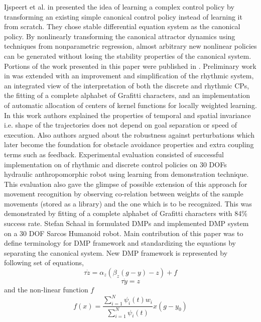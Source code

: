 Ijspeert et al. in \cite{ijspeert2003learning} presented the idea of learning a complex control policy by transforming
an existing simple canonical control policy instead of learning it from scratch. They chose stable differential equation system as the canonical policy. By nonlinearly transforming the canonical attractor dynamics using techniques from nonparametric regression, almost arbitrary new nonlinear policies can be generated without losing the stability properties of the canonical system. Portions of the work presented in this paper were published in \cite{ijspeert2002movement}. Preliminary work in \cite{ijspeert2002movement} was extended with an improvement and simplification of the rhythmic system, an integrated view of the interpretation of both the discrete and rhythmic CPs, the fitting of a complete alphabet of Grafitti characters, and an implementation of automatic allocation of centers of kernel functions for locally weighted learning. In this work authors explained the properties of temporal and spatial invariance i.e. shape of the trajectories does not depend on goal separation or speed of execution. Also authors argued about the robustness against perturbations which later become the foundation for obstacle avoidance properties and extra coupling terms such as feedback.
Experimental evaluation consisted of successful implementation on of rhythmic and discrete control policies on 30 DOFs hydraulic anthropomorphic robot using learning from demonstration technique. This evaluation also gave the glimpse of possible extension of this approach for movement recognition by observing co-relation between weights of the sample movements (stored as a library) and the one which is to be recognized. This was demonstrated by fitting of a complete alphabet of Grafitti characters with 84\% success rate. 
\newline
Stefan Schaal in \cite{schaal2006dynamic} formulated DMPs and implemented DMP system on a 30 DOF Sarcos Humanoid robot. Main contribution of this paper was to define terminology for DMP framework and standardizing the equations by separating the canonical system. 
New DMP framework is represented by following set of equations,  
\begin{equation}
\tau\dot{z} = \alpha_{z}(\beta_{z}(g - y) - z) + f
\end{equation}
\begin{equation}
\tau \dot{y} = z
\end{equation}
and the non-linear function $f$
\begin{equation}
f(x) = \frac{\sum_{i=1}^{N}\psi_{i}(t)w_{i}}{\sum_{i=1}^{N}\psi_{i}(t)}x(g - y_{0})
\end{equation}
